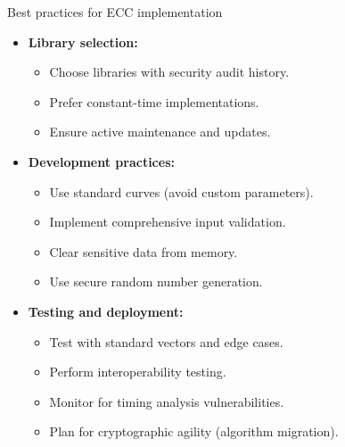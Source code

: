 \documentclass[aspectratio=169, lualatex, handout]{beamer}
\begin{document}
\begin{frame}{Best practices for ECC implementation}
	\begin{itemize}
		\item \textbf{Library selection:}
		      \begin{itemize}
			      \item Choose libraries with security audit history.
			      \item Prefer constant-time implementations.
			      \item Ensure active maintenance and updates.
		      \end{itemize}
		\item \textbf{Development practices:}
		      \begin{itemize}
			      \item Use standard curves (avoid custom parameters).
			      \item Implement comprehensive input validation.
			      \item Clear sensitive data from memory.
			      \item Use secure random number generation.
		      \end{itemize}
		\item \textbf{Testing and deployment:}
		      \begin{itemize}
			      \item Test with standard vectors and edge cases.
			      \item Perform interoperability testing.
			      \item Monitor for timing analysis vulnerabilities.
			      \item Plan for cryptographic agility (algorithm migration).
		      \end{itemize}
	\end{itemize}
\end{frame}
\end{document}
